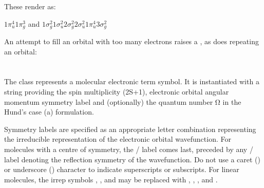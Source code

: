 \documentclass[letterpaper,10pt,english]{sphinxmanual}
\begin{document}
These render as:



$1\pi_u^{4}1\pi_g^{3}$ and
$1\sigma_g^{2}1\sigma_u^{2}2\sigma_g^{2}2\sigma_u^{2}1\pi_u^{4}3\sigma_g^{2}$

An attempt to fill an orbital with too many electrons raises a , as does repeating an orbital:

\begin{sphinxVerbatim}[commandchars=\\\{\}]
 \PYG{p}{[}\PYG{p}{]}   
          

 \PYG{p}{[}\PYG{p}{]}   
    
\end{sphinxVerbatim}


\section{}
\label{\detokenize{states:moleculartermsymbol}}
The  class represents a molecular electronic term symbol. It is instantiated with a string providing the spin multiplicity (2S+1), electronic orbital angular momentum symmetry label and (optionally) the quantum number Ω in the Hund’s case (a) formulation.

Symmetry labels are specified as an appropriate letter combination representing the irreducible representation of the electronic orbital wavefunction. For molecules with a centre of symmetry, the / label comes last, preceded by any \sphinxcode{\sphinxupquote{+}}/\sphinxcode{\sphinxupquote{\sphinxhyphen{}}} label denoting the reflection symmetry of the wavefunction. Do not use a caret (\sphinxcode{\sphinxupquote{\textasciicircum{}}}) or underscore (\sphinxcode{\sphinxupquote{\_}}) character to indicate superscripts or subscripts. For linear molecules, the irrep symbols , ,  and  may be replaced with , , , and .
\end{document}
